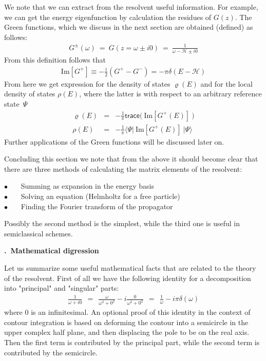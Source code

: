 \documentclass[onecolumn,fleqn, 11pt]{revtex4}
\newcommand{\trc}{\mathsf{trace}}
\newcommand{\im}{\mathrm{Im}}
\newcommand{\gdos}{\varrho} \newcommand{\EPS}{\mathcal{E}}
\newcommand{\bitem}{$\bullet$ \ \ \ }
\newcommand{\beq}{\begin{eqnarray}}
\newcommand{\eeq}{\end{eqnarray}}
\renewcommand{\thesubsection}{\arabic{subsection}}
\renewcommand{\thesubsubsection}{\arabic{subsubsection}}
\newcommand{\sheadC}[1]
{
\addtocounter{subsubsection}{1}
\vspace{5mm}
{\bf \thesubsection.\thesubsubsection \ #1}  
\nopagebreak
\phantomsection
}
\begin{document}
We note that we can extract from the resolvent 
useful information. For example, we can get 
the energy eigenfunction by calculation the residues 
of $G(z)$. The Green functions, which we discuss 
in the next section are obtained (defined) as follows: 
\beq
G^{\pm}(\omega) \ = \ G(z=\omega \pm i0) \ = \ \frac{1}{\omega - \mathcal{H} \pm i0}
\eeq
From this definition follows that 
\beq
\im[G^{+}]  \equiv  -\frac{i}{2} (G^{+}-G^{-}) = -\pi \delta(E-\mathcal{H})
\eeq
From here we get expression for 
the density of states $\gdos(E)$ and 
for the local density of states $\rho(E)$,    
where the latter is with respect 
to an arbitrary reference state~$\Psi$ 
\beq
\gdos(E) &=&  -\frac{1}{\pi} \trc\Big( \ \im[G^{+}(E)] \ \Big)
\\ \nonumber
\rho(E) &=& -\frac{1}{\pi} \Big\langle \Psi \Big| \ \im[G^{+}(E)] \ \Big| \Psi \Big\rangle
\eeq
Further applications of the Green functions 
will be discussed later on.



Concluding this section we note that from the 
above it should become clear that 
there are three methods of calculating 
the matrix elements of the resolvent: 

\bitem Summing as expansion in the energy basis  \\
\bitem Solving an equation (Helmholtz for a free particle) \\
\bitem Finding the Fourier transform of the propagator 

Possibly the second method is the simplest, 
while the third one is useful in semiclassical schemes.      



\sheadC{Mathematical digression}
 
Let us summarize some useful mathematical facts 
that are related to the theory of the resolvent. 
First of all we have the following identity for 
a decomposition into "principal" and "singular" parts: 
\beq
\frac{1}{\omega+i0} \ \ = \ \ \frac{\omega}{\omega^2+0^2}-i\frac{0}{\omega^2+0^2} 
\ \ = \ \  \frac{1}{\omega}-i\pi\delta(\omega)
\eeq
where $0$ is an infinitesimal. An optional proof of this 
identity in the context of contour integration is based 
on deforming the contour into a semicircle in the upper 
complex half plane, and then displacing the pole to be on  
the real axis. Then the first term is contributed 
by the principal part, while the second term is contributed by the semicircle. 
\end{document}
